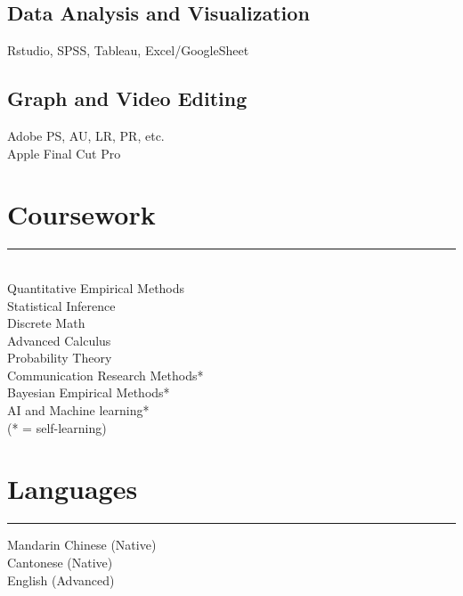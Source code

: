 \documentclass[]{rahulworld-resume}
\begin{document}
\begin{minipage}[t]{0.33\textwidth}
\subsection{Data Analysis and Visualization}
Rstudio, SPSS, Tableau,
Excel/GoogleSheet
\vspace{6pt}
\subsection{Graph and Video Editing}
Adobe PS, AU, LR, PR, etc.\\
Apple Final Cut Pro
\sectionsep
\section{Coursework}
\noindent\rule{5cm}{0.4pt}\\
Quantitative Empirical Methods\\
Statistical Inference\\
Discrete Math\\
Advanced Calculus\\
Probability Theory\\
Communication Research Methods* \\
Bayesian Empirical Methods* \\
AI and Machine learning* \\
(* = self-learning)
\sectionsep
\section{Languages} 
\noindent\rule{5cm}{0.4pt}
Mandarin Chinese (Native) \\
Cantonese (Native) \\
English (Advanced) \\
\sectionsep
%
%

\end{minipage} 
\hfill
\end{document}
